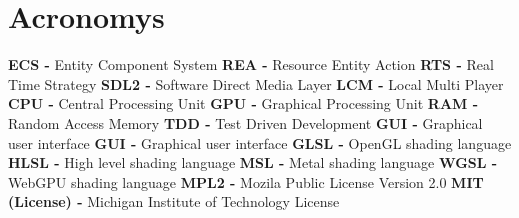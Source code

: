 \documentclass[]{final_report}
\begin{document}
\chapter{Acronomys}
\textbf{ECS - }Entity Component System \newline
\textbf{REA - }Resource Entity Action \newline
\textbf{RTS - }Real Time Strategy \newline
\textbf{SDL2 - }Software Direct Media Layer \newline
\textbf{LCM - }Local Multi Player \newline
\textbf{CPU - }Central Processing Unit \newline
\textbf{GPU - }Graphical Processing Unit \newline
\textbf{RAM - }Random Access Memory \newline
\textbf{TDD - }Test Driven Development \newline
\textbf{GUI - }Graphical user interface \newline
\textbf{GUI - }Graphical user interface \newline
\textbf{GLSL - }OpenGL shading language\newline
\textbf{HLSL - }High level shading language\newline
\textbf{MSL - }Metal shading language\newline
\textbf{WGSL - }WebGPU shading language\newline
\textbf{MPL2 - }Mozila Public License Version 2.0\newline
\textbf{MIT (License) - }Michigan Institute of Technology License\newline
\end{document}
